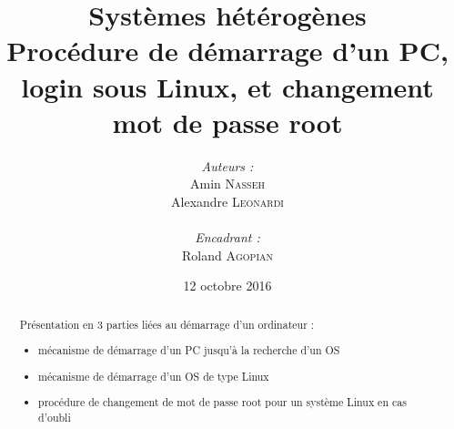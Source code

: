 \documentclass[a4paper,11pt]{article}
\title{
  \textbf{Systèmes hétérogènes}\\
  Procédure de démarrage d'un PC, login sous Linux, et changement mot de passe root
}
\author{
\begin{minipage}{0.4\textwidth}
	\begin{flushleft} \large
		\emph{Auteurs :}\\
                Amin \textsc{Nasseh}\\
		Alexandre \textsc{Leonardi}\\
	\end{flushleft}
\end{minipage}
\begin{minipage}{0.4\textwidth}
	\begin{flushright} \large
		\emph{Encadrant :} \\
		Roland \textsc{Agopian}\\
	\end{flushright}
\end{minipage}
}
\date{12 octobre 2016}
\begin{document}
\maketitle
\thispagestyle{empty}
\begin{abstract}
Présentation en 3 parties liées au démarrage d'un ordinateur :
\begin{itemize}
	\item mécanisme de démarrage d'un PC jusqu'à la recherche d'un OS
    \item mécanisme de démarrage d'un OS de type Linux
    \item procédure de changement de mot de passe root pour un système Linux en cas d'oubli
\end{itemize}
\end{abstract}
\pagebreak

\tableofcontents
\pagebreak


\pagebreak

\pagebreak

\pagebreak

\pagebreak
\nocite{*}

\end{document}

